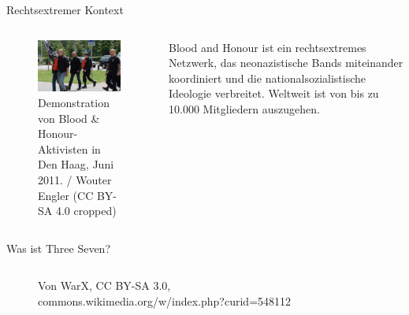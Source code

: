 \documentclass{cubeamer}
\begin{document}
\begin{frame}{Rechtsextremer Kontext}
    \begin{columns}
        \begin{column}{0.6\textwidth}
            \begin{figure}
                \centering
                \includegraphics[height = 0.5\textheight]{img/bah.jpg}
                \caption{\tiny Demonstration von Blood \& Honour-Aktivisten in Den Haag, Juni 2011. / Wouter Engler (CC BY-SA 4.0 cropped)}
            \end{figure}
        \end{column}
        \begin{column}{0.4\textwidth}
Blood and Honour ist ein rechtsextremes Netzwerk, das neonazistische Bands miteinander  koordiniert und die nationalsozialistische Ideologie verbreitet. Weltweit ist von bis zu 10.000 Mitgliedern auszugehen.
        \end{column}
    \end{columns}
\end{frame}

\begin{frame}{Was ist Three Seven?}
    \begin{columns}
        \begin{column}{0.6\textwidth}
            \begin{figure}
                
                \caption{\tiny Von WarX, CC BY-SA 3.0, commons.wikimedia.org/w/index.php?curid=548112}
            \end{figure}
        \end{column}
        \begin{column}{0.4\textwidth}
            \begin{figure}
                
            \end{figure}
        \end{column}
    \end{columns}
\end{frame}
\end{document}
